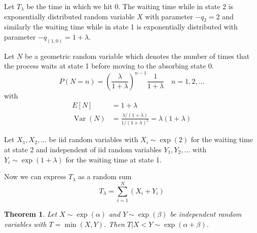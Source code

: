 \documentclass{article}
\theoremstyle{plain}
\newtheorem{theorem}{Theorem}[section]
\theoremstyle{definition}
\theoremstyle{remark}
\newcommand{\Var}{\operatorname {Var}}
\begin{document}
Let $T_\lambda$ be the time in which we hit 0.
The waiting time while in state 2 is exponentially distributed random variable $X$ with parameter $- q_{2} = 2$ and similarly the waiting time while in state 1 is exponentially distributed with parameter $- q_{(1,0)} = 1 + \lambda$.

Let $N$ be a geometric random variable which denotes the number of times that the process waits at state 1 before moving to the absorbing state 0.
$$
P(N = n) = \left(\frac{\lambda}{1 + \lambda} \right)^{n - 1} \frac{1}{1 + \lambda} \quad n = 1,2,\ldots
$$
with
\begin{align*}
    E[N] &= 1 + \lambda\\
    \Var(N) &= \frac{\lambda/(1 + \lambda)}{1/(1 + \lambda)^2} = \lambda (1 + \lambda)
\end{align*}

Let $X_1, X_2, \ldots$ be iid random variables with
$X_i \sim \exp(2)$ for the waiting time at state 2 and independent of iid random variables $Y_1, Y_2, \ldots$ with  $Y_i \sim \exp(1 + \lambda)$ for the waiting time at state 1.

Now we can express $T_\lambda$ as a random sum
$$
T_\lambda = \sum_{i = 1}^N (X_i + Y_i)
$$

\begin{theorem}
Let $X \sim \exp(\alpha)$ and $Y \sim \exp(\beta)$ be independent random variables with $T = \min(X,Y)$.
Then $T | X < Y \sim \exp(\alpha + \beta)$.
\end{theorem}
\end{document}
